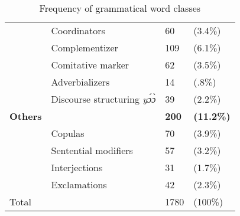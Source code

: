 \begin{table}
\begin{tabular}{ll|ll}
 & Coordinators   & 60 & (3.4\%) \\
 & Complementizer  & 109 & (6.1\%) \\
& Comitative marker  & 62  & (3.5\%) \\ %
& Adverbializers  & 14 & (.8\%) \\ %
  & Discourse structuring {\itshape yɔ́ɔ̀}  & 39 & (2.2\%) \\
 {\bfseries Others} &  & {\bfseries 200} & {\bfseries (11.2\%)} \\
 & Copulas  & 70 & (3.9\%) \\
 & Sentential modifiers  & 57 & (3.2\%) \\
 & Interjections  & 31 & (1.7\%) \\
 & Exclamations  & 42 & (2.3\%) \\
 \midrule
  Total & & 1780 & (100\%) \\
 \midrule
\end{tabular}
\caption{Frequency of grammatical word classes}
\label{Tab:POSnogram}
\end{table}

\fi


